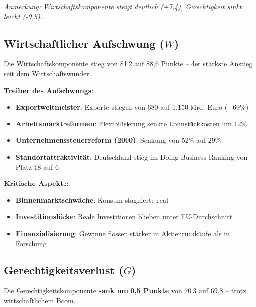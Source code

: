\begin{flushleft}
\footnotesize{\textit{Anmerkung: Wirtschaftskomponente steigt deutlich (+7,4), Gerechtigkeit sinkt leicht (-0,5).}}
\end{flushleft}

\subsection{Wirtschaftlicher Aufschwung (\(W\))}

Die Wirtschaftskomponente stieg von 81,2 auf 88,6 Punkte – der stärkste Anstieg seit dem Wirtschaftswunder.

\textbf{Treiber des Aufschwungs}:
\begin{itemize}
    \item \textbf{Exportweltmeister}: Exporte stiegen von 680 auf 1.150 Mrd. Euro (+69\%)
    \item \textbf{Arbeitsmarktreformen}: Flexibilisierung senkte Lohnstückkosten um 12\%
    \item \textbf{Unternehmenssteuerreform (2000)}: Senkung von 52\% auf 29\% 
    \item \textbf{Standortattraktivität}: Deutschland stieg im Doing-Business-Ranking von Platz 18 auf 6
\end{itemize}

\textbf{Kritische Aspekte}:
\begin{itemize}
    \item \textbf{Binnenmarktschwäche}: Konsum stagnierte real
    \item \textbf{Investitionslücke}: Reale Investitionen blieben unter EU-Durchschnitt
    \item \textbf{Finanzialisierung}: Gewinne flossen stärker in Aktienrückkäufe als in Forschung
\end{itemize}

\subsection{Gerechtigkeitsverlust (\(G\))}

Die Gerechtigkeitskomponente \textbf{sank um 0,5 Punkte} von 70,3 auf 69,8 – trotz wirtschaftlichem Boom.

